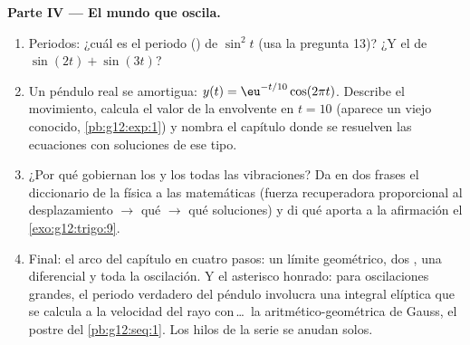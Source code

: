 \begin{problem}
\medskip
\noindent\textbf{Parte IV --- El mundo que oscila.}
\begin{enumerate}[resume]
  \item Periodos: ¿cuál es el periodo () de $\sin^2 t$ (usa la
        pregunta 13)? ¿Y el de $\sin(2t) + \sin(3t)$?
  \item Un péndulo real se amortigua: $y(t) = \eu^{-t/10}\cos(2\pi t)$.
        Describe el movimiento, calcula el valor de la envolvente en
        $t = 10$ (aparece un viejo conocido, \cref{pb:g12:exp:1}) y nombra
        el capítulo donde se resuelven las ecuaciones con soluciones de ese
        tipo.
  \item ¿Por qué gobiernan los  y los  todas las vibraciones?
        Da en dos frases el diccionario de la física a las matemáticas
        (fuerza recuperadora proporcional al desplazamiento
        $\rightarrow$ qué  $\rightarrow$ qué soluciones) y di qué
        aporta a la afirmación el \cref{exo:g12:trigo:9}.
  \item Final: el arco del capítulo en cuatro pasos: un límite geométrico,
        dos , una  diferencial y toda la oscilación. Y el
        asterisco honrado: para oscilaciones grandes, el periodo verdadero
        del péndulo involucra una integral elíptica que se calcula a la
        velocidad del rayo con\,\dots\ la  aritmético-geométrica de
        Gauss, el postre del \cref{pb:g12:seq:1}. Los hilos de la serie se
        anudan solos.
\end{enumerate}
\end{problem}
